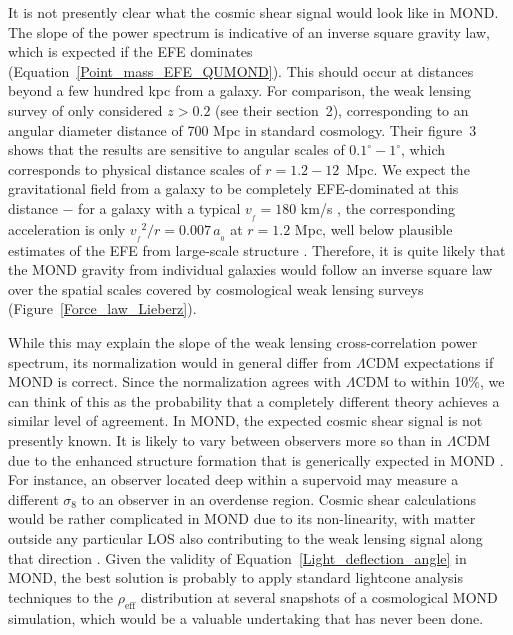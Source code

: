\documentclass[fleqn,usenatbib,useAMS]{mnras} %
\begin{document}
It is not presently clear what the cosmic shear signal would look like in MOND. The slope of the power spectrum is indicative of an inverse square gravity law, which is expected if the EFE dominates (Equation~\ref{Point_mass_EFE_QUMOND}). This should occur at distances beyond a few hundred kpc from a galaxy. For comparison, the weak lensing survey of \citet{DES_2018} only considered $z > 0.2$ (see their section~2), corresponding to an angular diameter distance of 700 Mpc in standard cosmology. Their figure~3 shows that the results are sensitive to angular scales of $0.1^\circ - 1^\circ$, which corresponds to physical distance scales of $r = 1.2 - 12$~Mpc. We expect the gravitational field from a galaxy to be completely EFE-dominated at this distance $-$ for a galaxy with a typical $v_{_f} = 180$ km/s \citep{Kafle_2012}, the corresponding acceleration is only ${v_{_f}}^2/r = 0.007 \, a_{_0}$ at $r = 1.2$ Mpc, well below plausible estimates of the EFE from large-scale structure \citep[e.g.][]{Famaey_2007, Banik_Ryan_2018, Chae_2020_EFE, Chae_2021, Haslbauer_2020}. Therefore, it is quite likely that the MOND gravity from individual galaxies would follow an inverse square law over the spatial scales covered by cosmological weak lensing surveys (Figure~\ref{Force_law_Lieberz}).

While this may explain the slope of the weak lensing cross-correlation power spectrum, its normalization would in general differ from $\Lambda$CDM expectations if MOND is correct. Since the normalization agrees with $\Lambda$CDM to within 10\%, we can think of this as the probability that a completely different theory achieves a similar level of agreement. In MOND, the expected cosmic shear signal is not presently known. It is likely to vary between observers more so than in $\Lambda$CDM due to the enhanced structure formation that is generically expected in MOND \citep[e.g.][]{Sanders_2001, Angus_2013, Haslbauer_2020}. For instance, an observer located deep within a supervoid may measure a different $\sigma_8$ to an observer in an overdense region. Cosmic shear calculations would be rather complicated in MOND due to its non-linearity, with matter outside any particular LOS also contributing to the weak lensing signal along that direction \citep{Feix_2008}. Given the validity of Equation~\ref{Light_deflection_angle} in MOND, the best solution is probably to apply standard lightcone analysis techniques to the $\rho_{\text{eff}}$ distribution at several snapshots of a cosmological MOND simulation, which would be a valuable undertaking that has never been done.
\end{document}
